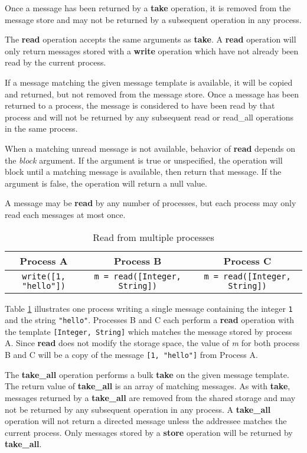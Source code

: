 Once a message has been returned by a \textbf{take} operation, it is removed from the message store and may not be returned by a subsequent operation in any process.

The \textbf{read} operation accepts the same arguments as \textbf{take}. A \textbf{read} operation will only return messages stored with a \textbf{write} operation which have not already been read by the current process.

If a message matching the given message template is available, it will be copied and returned, but not removed from the message store. Once a message has been returned to a process, the message is considered to have been read by that process and will not be returned by any subsequent read or read\_all operations in the same process.

When a matching unread message is not available, behavior of \textbf{read} depends on the \textit{block} argument. If the argument is true or unspecified, the operation will block until a matching message is available, then return that message. If the argument is false, the operation will return a null value.

A message may be \textbf{read} by any number of processes, but each process may only read each messages at most once.

\begin{table}\footnotesize
\centering
\caption{Read from multiple processes}
\begin{tabular}{|c|c|c|} \hline
\textbf{Process A} & \textbf{Process B} & \textbf{Process C} \\ \hline
\texttt{write([1, "hello"])} & \texttt{m = read([Integer, String])} & \texttt{m = read([Integer, String])} \\ \hline
\end{tabular}
\label{fig:readprocesses}
\end{table}

Table \ref{fig:readprocesses} illustrates one process writing a single message containing the integer \texttt{1} and the string \texttt{"hello"}. Processes B and C each perform a \textbf{read} operation with the template \texttt{[Integer, String]} which matches the message stored by process A. Since \textbf{read} does not modify the storage space, the value of \textit{m} for both process B and C will be a copy of the message \texttt{[1, "hello"]} from Process A.

The \textbf{take\_all} operation performs a bulk \textbf{take} on the given message template. The return value of \textbf{take\_all} is an array of matching messages. As with \textbf{take}, messages returned by a \textbf{take\_all} are removed from the shared storage and may not be returned by any subsequent operation in any process. A \textbf{take\_all} operation will not return a directed message unless the addressee matches the current process. Only messages stored by a \textbf{store} operation will be returned by \textbf{take\_all}.

